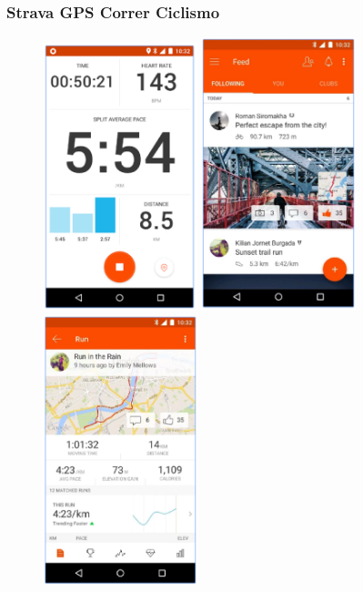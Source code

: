 \documentclass[a4paper, 11pt]{article}
\begin{document}
          \subsubsection{Strava GPS Correr Ciclismo}


                    \begin{figure}[H]
                        \centering
                        \includegraphics[width=0.4\textwidth]{strava1}
                        \includegraphics[width=0.4\textwidth]{strava2}
                        \includegraphics[width=0.4\textwidth]{strava3}

\end{figure}
\end{document}
